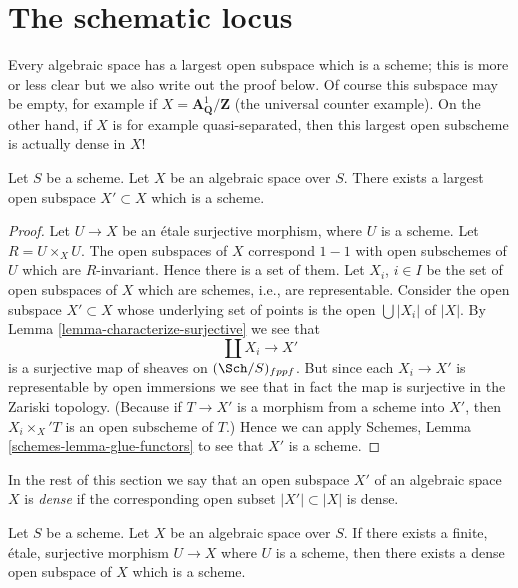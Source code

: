 \section{The schematic locus}
\label{section-schematic}

\noindent
Every algebraic space has a largest open subspace which is a
scheme; this is more or less clear but we also write out the proof below.
Of course this subspace may be empty, for example if
$X = \mathbf{A}^1_{\mathbf{Q}}/\mathbf{Z}$ (the universal
counter example). On the other hand, if $X$ is for example quasi-separated,
then this largest open subscheme is actually dense in $X$!

\begin{lemma}
\label{lemma-subscheme}
Let $S$ be a scheme.
Let $X$ be an algebraic space over $S$.
There exists a largest open subspace $X' \subset X$ which is a scheme.
\end{lemma}

\begin{proof}
Let $U \to X$ be an \'etale surjective morphism, where $U$ is a scheme.
Let $R = U \times_X U$. The open subspaces of $X$ correspond $1 - 1$
with open subschemes of $U$ which are $R$-invariant. Hence there is a
set of them. Let $X_i$, $i \in I$ be the set of open subspaces
of $X$ which are schemes, i.e., are representable. Consider the
open subspace $X' \subset X$ whose underlying set of points is
the open $\bigcup |X_i|$ of $|X|$. By
Lemma \ref{lemma-characterize-surjective}
we see that
$$
\coprod X_i \longrightarrow X'
$$
is a surjective map of sheaves on $(\Sch/S)_{fppf}$.
But since each $X_i \to X'$ is representable by open immersions
we see that in fact the map is surjective in the Zariski
topology. (Because if $T \to X'$ is a morphism from a scheme
into $X'$, then $X_i \times_X' T$ is an open subscheme of $T$.)
Hence we can apply
Schemes, Lemma \ref{schemes-lemma-glue-functors}
to see that $X'$ is a scheme.
\end{proof}

\noindent
In the rest of this section we say that an open subspace
$X'$ of an algebraic space $X$ is {\it dense} if the corresponding
open subset $|X'| \subset |X|$ is dense.

\begin{lemma}
\label{lemma-finite-etale-cover-dense-open-scheme}
Let $S$ be a scheme. Let $X$ be an algebraic space over $S$.
If there exists a finite, \'etale, surjective morphism
$U \to X$ where $U$ is a scheme, then there exists a dense open subspace
of $X$ which is a scheme.
\end{lemma}

